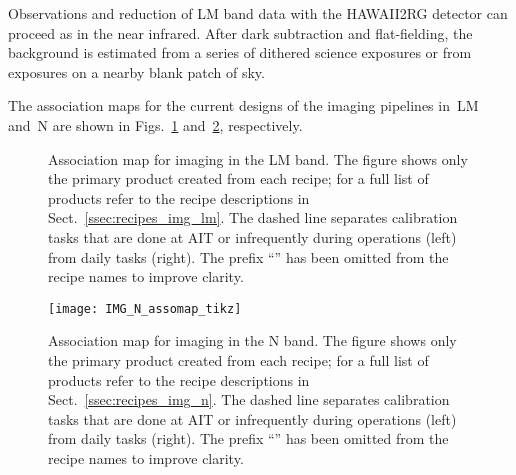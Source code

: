 Observations and reduction of LM band data with the HAWAII2RG detector
can proceed as in the near infrared. After dark subtraction and
flat-fielding, the background is estimated from a series of dithered
science exposures or from exposures on a nearby blank patch of sky.

The association maps for the current designs of the imaging pipelines
in~LM and~N are shown in Figs.~\ref{fig:IMG_LM_Assomap}
and~\ref{fig:IMG_N_Assomap}, respectively.


\begin{landscape}
  \begin{figure}
    \centering
    \resizebox{\linewidth}{!}{}
    \caption[Reduction cascade and association map for imaging in L and
      M]{Association map for imaging in the LM band. The figure shows only
      the primary product created from each recipe; for a full list of
      products refer to the recipe descriptions in
      Sect.~\ref{ssec:recipes_img_lm}. The dashed line separates
      calibration tasks that are done at AIT or infrequently during
      operations (left) from daily tasks (right). The prefix ``'' has been
      omitted from the recipe names to improve clarity.}
    \label{fig:IMG_LM_Assomap}
  \end{figure}
\end{landscape}

\begin{landscape}
\begin{figure}
  \centering
    \texttt{[image: IMG\_N\_assomap\_tikz]}
    \caption[Reduction cascade and association map for imaging in N]{%
      Association map for imaging in the N band. The figure shows
      only the primary product created from each recipe; for a full
      list of products refer to the recipe descriptions in
      Sect.~\ref{ssec:recipes_img_n}. The dashed line separates
      calibration tasks that are done at AIT or infrequently during
      operations (left) from daily tasks (right). The prefix ``'' has
      been omitted from the recipe names to improve clarity.}
    \label{fig:IMG_N_Assomap}
  \end{figure}
\end{landscape}

